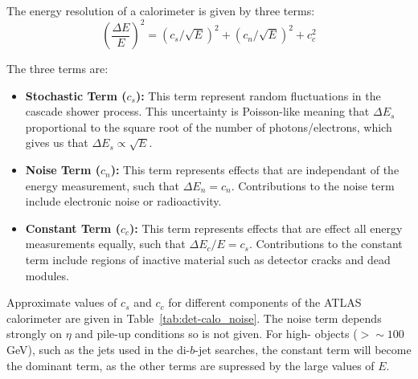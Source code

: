 The energy resolution of a calorimeter is given by three terms:
\begin{equation}
  (\frac{\Delta E}{E})^2 = (c_s/\sqrt{E})^2 + (c_n/\sqrt{E})^2 + c_c^2
\end{equation}

\noindent
The three terms are:
\begin{itemize}[leftmargin=*]
\item\textbf{Stochastic Term ($c_s$):}
  This term represent random fluctuations in the cascade shower process.
  This uncertainty is Poisson-like meaning that $\Delta E_s$ proportional to the square root of the number of photons/electrons,
  which gives us that $\Delta E_s \propto \sqrt{E}$. \vspace{0.5em}
\item\textbf{Noise Term ($c_n$):}
  This term represents effects that are independant of the energy measurement, such that $\Delta E_n = c_n$.
  Contributions to the noise term include electronic noise or radioactivity. \vspace{0.5em}
\item\textbf{Constant Term ($c_c$):}
  This term represents effects that are effect all energy measurements equally, such that $\Delta E_c/E = c_s$.
  Contributions to the constant term include regions of inactive material such as detector cracks and dead modules.
\end{itemize}

Approximate values of $c_s$ and $c_c$ for different components of the ATLAS calorimeter are given in Table~\ref{tab:det-calo_noise}.
The noise term depends strongly on $\eta$ and pile-up conditions so is not given.
For high-\pT{} objects ($\gt \sim 100$ GeV), such as the jets used in the di-$b$-jet searches, the constant term will become the dominant term,
as the other terms are supressed by the large values of $E$.

